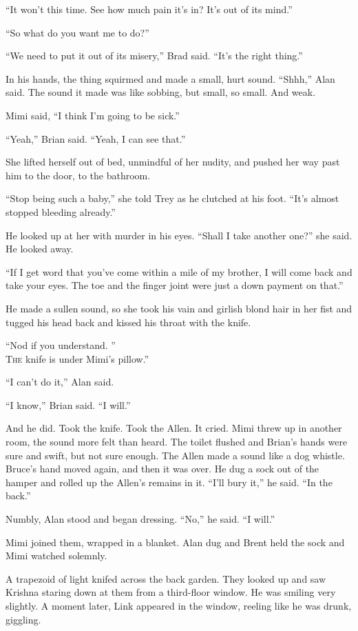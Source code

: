 ``It won't this time.  See how much pain it's in?  It's out of its
mind.''

``So what do you want me to do?''

``We need to put it out of its misery,'' Brad said.  ``It's the right
thing.''

In his hands, the thing squirmed and made a small, hurt sound. 
``Shhh,'' Alan said.  The sound it made was like sobbing, but small,
so small.  And weak.

Mimi said, ``I think I'm going to be sick.''

``Yeah,'' Brian said.  ``Yeah, I can see that.''

She lifted herself out of bed, unmindful of her nudity, and pushed her
way past him to the door, to the bathroom.

``Stop being such a baby,'' she told Trey as he clutched at his foot. 
``It's almost stopped bleeding already.''

He looked up at her with murder in his eyes.  ``Shall I take another
one?'' she said.  He looked away.

``If I get word that you've come within a mile of my brother, I will
come back and take your eyes.  The toe and the finger joint were just
a down payment on that.''

He made a sullen sound, so she took his vain and girlish blond hair in
her fist and tugged his head back and kissed his throat with the
knife.

``Nod if you understand.  ''
\\
\lettrine[lines=3, lhang=.5, nindent=0pt, findent=2pt]{T}{he}
knife is under Mimi's pillow.''

``I can't do it,'' Alan said. 

``I know,'' Brian said.  ``I will.''

And he did.  Took the knife.  Took the Allen.  It cried.  Mimi threw
up in another room, the sound more felt than heard.  The toilet
flushed and Brian's hands were sure and swift, but not sure enough. 
The Allen made a sound like a dog whistle.  Bruce's hand moved again,
and then it was over.  He dug a sock out of the hamper and rolled up
the Allen's remains in it.  ``I'll bury it,'' he said.  ``In the
back.''

Numbly, Alan stood and began dressing.  ``No,'' he said.  ``I will.''

Mimi joined them, wrapped in a blanket.  Alan dug and Brent held the
sock and Mimi watched solemnly. 

A trapezoid of light knifed across the back garden.  They looked up
and saw Krishna staring down at them from a third-floor window.  He
was smiling very slightly.  A moment later, Link appeared in the
window, reeling like he was drunk, giggling.

